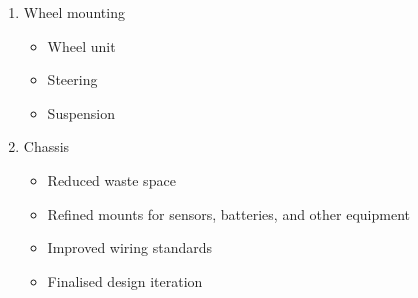 \begin{enumerate}
\begin{itemize}
        
   	\end{itemize}
    
   	\item Wheel mounting
   	\begin{itemize}
     	\item Wheel unit
        \item Steering
        \item Suspension
   	\end{itemize}
    
	\item Chassis
   	\begin{itemize}
     	\item Reduced waste space
     	\item Refined mounts for sensors, batteries, and other equipment
     	\item Improved wiring standards
     	\item Finalised design iteration
   \end{itemize}
\end{enumerate}